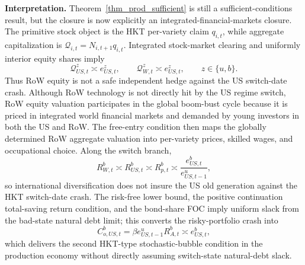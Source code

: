 \documentclass{article}
\begin{document}
\noindent
\textbf{Interpretation.} Theorem~\ref{thm_prod_sufficient} is still a sufficient-conditions result, but the closure is now explicitly an integrated-financial-markets closure. The primitive stock object is the HKT per-variety claim $q_{i,t}$, while aggregate capitalization is $\mathcal Q_{i,t}=N_{i,t+1}q_{i,t}$. Integrated stock-market clearing and uniformly interior equity shares imply
\[
\mathcal Q_{US,t}^z\asymp e_{US,t}^z,
\qquad
\mathcal Q_{W,t}^z\asymp e_{US,t}^z,
\qquad z\in\{u,b\}.
\]
Thus RoW equity is not a safe independent hedge against the US switch-date crash. Although RoW technology is not directly hit by the US regime switch, RoW equity valuation participates in the global boom-bust cycle because it is priced in integrated world financial markets and demanded by young investors in both the US and RoW. The free-entry condition then maps the globally determined RoW aggregate valuation into per-variety prices, skilled wages, and occupational choice. Along the switch branch,
\[
R_{W,t}^b\asymp R_{US,t}^b\asymp R_{p,t}^b\asymp \frac{e_{US,t}^b}{e_{US,t-1}^u},
\]
so international diversification does not insure the US old generation against the HKT switch-date crash. The risk-free lower bound, the positive continuation total-saving return condition, and the bond-share FOC imply uniform slack from the bad-state natural debt limit; this converts the risky-portfolio crash into
\[
C_{o,US,t}^b
=
\beta e_{US,t-1}^uR_{A,t}^b
\asymp e_{US,t}^b,
\]
which delivers the second HKT-type stochastic-bubble condition in the production economy without directly assuming switch-state natural-debt slack.




\appendix


\end{document}
